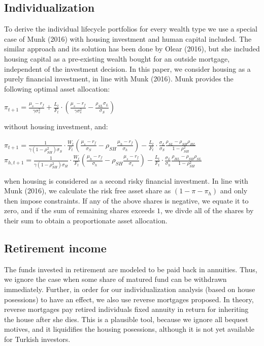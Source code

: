 \documentclass[]{article}
\begin{document}
\subsection{Individualization}

To derive the individual lifecycle portfolios for every wealth type we use a special case of Munk (2016) with housing investment and human capital included. The similar approach and its solution has been done by Olear (2016), but she included housing capital as a pre-existing wealth bought for an outside mortgage, independent of the investment decision. In this paper, we consider housing as a purely financial investment, in line with Munk (2016). Munk provides the following optimal asset allocation:


\begin{center}
	$\pi_{t+1} = \frac{\mu_s - r_f}{\gamma \sigma^2_s}  + \frac{L_t}{F_t} \cdot \left(\frac{\mu_s - r_f}{\gamma \sigma^2_s} - \frac{\rho_{SL}\sigma_L}{\sigma_S} \right)$
\end{center}

without housing investment, and:

\begin{center}
	$\pi_{t+1} = \frac{1}{\gamma (1 - \rho^2_{SH}) \sigma_S} \cdot \frac{W_t}{F_t} \left( \frac{\mu_s - r_f}{\sigma_S} - \rho_{SH} \frac{\mu_h - r_f}{\sigma_h} \right) - \frac{L_t}{F_t} \cdot \frac{\sigma_L}{\sigma_S} \frac{\rho_{SL} - \rho_{SH}\rho_{HL}}{1 - \rho^2_{SH}}$\\
	$\pi_{h,t+1} = \frac{1}{\gamma (1 - \rho^2_{SH}) \sigma_H} \cdot \frac{W_t}{F_t} \left( \frac{\mu_h - r_f}{\sigma_h} - \rho_{SH} \frac{\mu_s - r_f}{\sigma_s} \right) - \frac{L_t}{F_t} \cdot \frac{\sigma_L}{\sigma_h} \frac{\rho_{HL} - \rho_{SH}\rho_{SL}}{1 - \rho^2_{SH}}$
\end{center}

when housing is considered as a second risky financial investment. In line with Munk (2016), we calculate the risk free asset share as $\left( 1 - \pi - \pi_h \right)$ and only then impose constraints. If any of the above shares is negative, we equate it to zero, and if the sum of remaining shares exceeds $1$, we divde all of the shares by their sum to obtain a proportionate asset allocation. 

\subsection{Retirement income}

The funds invested in retirement are modeled to be paid back in annuities. Thus, we ignore the case when some share of matured fund can be withdrawn immediately. Further, in order for our individualization analysis (based on house posessions) to have an effect, we also use reverse mortgages proposed. In theory, reverse mortgages pay retired individuals fixed annuity in return for inheriting the house after she dies. This is a plausible tool, because we ignore all bequest motives, and it liquidifies the housing posessions, although it is not yet available for Turkish investors. 
\end{document}
